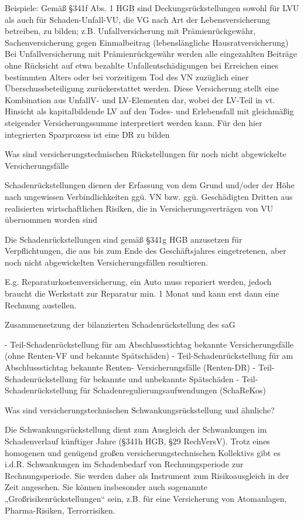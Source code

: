 Beispiele:
Gemäß §341f Abs. 1 HGB sind Deckungsrückstellungen sowohl für LVU als auch für Schaden-Unfall-VU, die VG nach Art der Lebensversicherung
betreiben, zu bilden; z.B. Unfallversicherung mit Prämienrückgewähr, Sachenversicherung gegen Einmalbeitrag (lebenslängliche
Hausratversicherung)
Bei Unfallversicherung mit Prämienrückgewähr werden alle eingezahlten Beiträge ohne Rücksicht auf etwa bezahlte Unfallentschädigungen bei
Erreichen eines bestimmten Alters oder bei vorzeitigem Tod des VN zuzüglich einer Überschussbeteiligung zurückerstattet werden. Diese
Versicherung stellt eine Kombination aus UnfallV- und LV-Elementen dar, wobei der LV-Teil in vt. Hinsicht als kapitalbildende LV auf den Todes- und
Erlebensfall mit gleichmäßig steigender Versicherungssumme interpretiert werden kann. Für den hier integrierten Sparprozess ist eine DR zu bilden


Was sind versicherungstechnischen Rückstellungen für noch nicht abgewickelte Versicherungsfälle

Schadenrückstellungen dienen der Erfassung von dem Grund und/oder der Höhe nach ungewissen Verbindlichkeiten ggü. VN bzw. ggü.
Geschädigten Dritten aus realisierten wirtschaftlichen Risiken, die in Versicherungsverträgen von VU übernommen worden sind

Die Schadenrückstellungen sind gemäß §341g HGB anzusetzen für Verpflichtungen, die aus bis zum Ende des Geschäftsjahres eingetretenen, aber
noch nicht abgewickelten Versicherungsfällen resultieren.

E.g. Reparaturkostenversicherung, ein Auto muss repariert werden, jedoch braucht die Werkstatt zur Reparatur min. 1 Monat und kann erst dann eine Rechnung austellen.

Zusammensetzung der bilanzierten Schadenrückstellung des saG

- Teil-Schadenrückstellung für am Abschlussstichtag bekannte Versicherungsfälle
  (ohne Renten-VF und bekannte Spätschäden)
- Teil-Schadenrückstellung für am Abschlussstichtag bekannte Renten-
  Versicherungsfälle (Renten-DR)
- Teil-Schadenrückstellung für bekannte und unbekannte Spätschäden
- Teil-Schadenrückstellung für Schadenregulierungsaufwendungen (SchaReKos)


Was sind versicherungstechnischen Schwankungsrückstellung und ähnliche?

Die Schwankungsrückstellung dient zum Ausgleich der Schwankungen im Schadenverlauf künftiger Jahre (§341h HGB, §29 RechVersV). Trotz
eines homogenen und genügend großen versicherungstechnischen Kollektivs gibt es i.d.R. Schwankungen im Schadenbedarf von Rechnungsperiode
zur Rechnungsperiode. Sie werden daher als Instrument zum Risikoausgleich in der Zeit angesehen.
Sie können insbesonder auch sogenannte „Großrisikenrückstellungen“ sein, z.B. für eine
Versicherung von Atomanlagen, Pharma-Risiken, Terrorrisiken.

